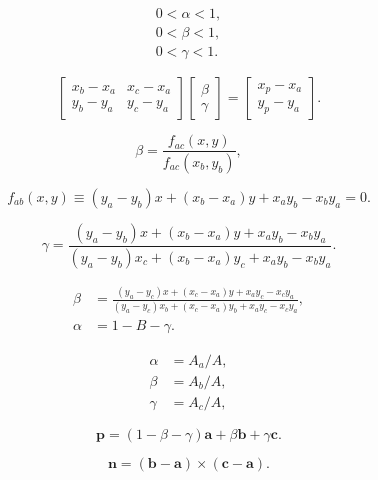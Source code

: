 \documentclass[lang=cn,12pt,marginpar=margintrue]{elegantbook}
\begin{document}
\[
  \begin{array}{c}{{0<\alpha<1,}}\\ {{0<\beta<1,}}\\ {{0<\gamma<1.}}\end{array}
\]

\begin{equation}
  \begin{bmatrix}
    x_b-x_a & x_c-x_a \\
    y_b-y_a & y_c-y_a
  \end{bmatrix}
  \begin{bmatrix}
    \beta \\
    \gamma
  \end{bmatrix}=
  \begin{bmatrix}
    x_p-x_a \\
    y_p-y_a
  \end{bmatrix}.
\end{equation}

\begin{equation}
  \beta=\frac{f_{a c}(x,y)}{f_{a c}(x_{b},y_{b})},
\end{equation}

\[
  f_{a b}(x,y)\equiv(y_{a}-y_{b})x+(x_{b}-x_{a})y+x_{a}y_{b}-x_{b}y_{a}=0.
\]

\[
  \gamma=\frac{(y_{a}-y_{b})x+(x_{b}-x_{a})y+x_{a}y_{b}-x_{b}y_{a}}{(y_{a}-y_{b})x_{c}+(x_{b}-x_{a})y_{c}+x_{a}y_{b}-x_{b}y_{a}}.
\]

\[
  \begin{aligned}
    \beta  & =\frac{(y_{a}-y_{c})x+(x_{c}-x_{a})y+x_{a}y_{c}-x_{c}y_{a}}{(y_{a}-y_{c})x_{b}+(x_{c}-x_{a})y_{b}+x_{a}y_{c}-x_{c}y_{a}}, \\
    \alpha & =1-B-\gamma.
  \end{aligned}
\]

\begin{equation}
  \begin{aligned}
    \alpha & =A_{a}/A, \\
    \beta  & =A_{b}/A, \\
    \gamma & =A_{c}/A,
  \end{aligned}
\end{equation}

\[
  \mathbf{p}=(1-\beta-\gamma)\mathbf{a}+\beta\mathbf{b}+\gamma\mathbf{c}.
\]

\begin{equation}
  \mathbf{n}=(\mathbf{b}-\mathbf{a})\times(\mathbf{c}-\mathbf{a}).
\end{equation}
\end{document}
